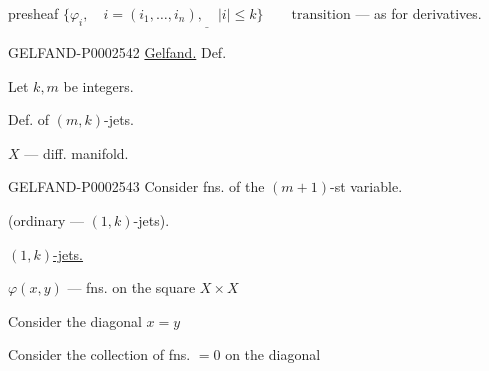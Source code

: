 presheaf $\underline{\{\varphi_i,\quad i=(i_1,\ldots, i_n),\quad |i|\le k\}\qquad\text{transition}}$ — as for derivatives.





\begin{GelfandAdjacentEvidence}{GELFAND-P000254}{2}
\underline{Gelfand.} Def.

Let $k, m$ be integers.





Def. of $(m, k)$-jets.

\end{GelfandAdjacentEvidence}


$X$ — diff. manifold.

\begin{GelfandAdjacentEvidence}{GELFAND-P000254}{3}
Consider fns. of the $(m+1)$-st variable.

\end{GelfandAdjacentEvidence}


(ordinary — $(1, k)$-jets).

\underline{$(1, k)$-jets.}

$\varphi (x, y)$ — fns. on the square $X\times X$

Consider the diagonal $x=y$

Consider the collection of fns. $=0$ on the diagonal

